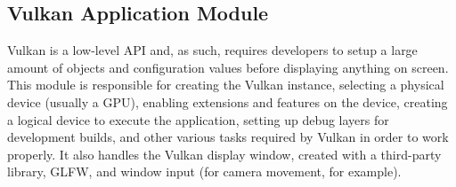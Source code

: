 \subsection{Vulkan Application Module}
Vulkan is a low-level API and, as such, requires developers to setup a large amount of objects and configuration values before displaying anything on screen. This module is responsible for creating the Vulkan instance, selecting a physical device (usually a GPU), enabling extensions and features on the device, creating a logical device to execute the application, setting up debug layers for development builds, and other various tasks required by Vulkan in order to work properly. It also handles the Vulkan display window, created with a third-party library, GLFW, and window input (for camera movement, for example).

